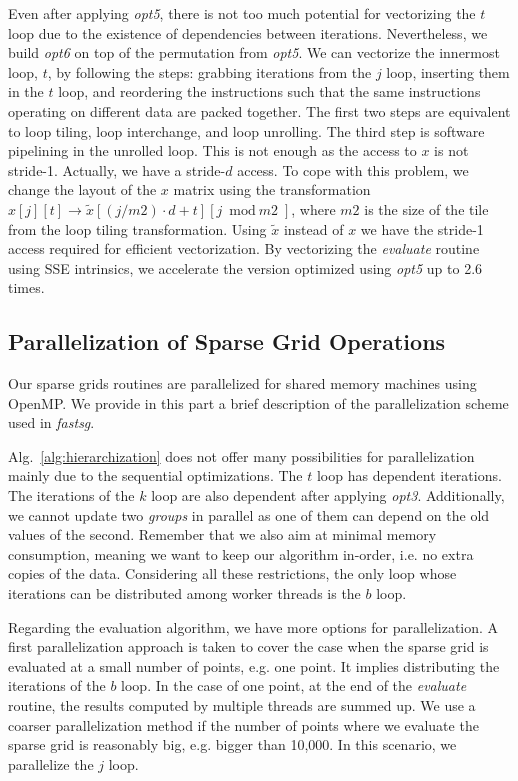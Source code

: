 Even after applying \textit{opt5}, there is not too much potential for vectorizing the $t$ loop due to the existence of dependencies between iterations. Nevertheless, we build \textit{opt6} on top of the permutation from \textit{opt5}. We can vectorize the innermost loop, $t$, by following the steps: grabbing iterations from the $j$ loop, inserting them in the $t$ loop, and reordering the instructions such that the same instructions operating on different data are packed together. The first two steps are equivalent to loop tiling, loop interchange, and loop unrolling. The third step is software pipelining in the unrolled loop. This is not enough as the access to $x$ is not stride-1. Actually, we have a stride-$d$ access. To cope with this problem, we change the layout of the $x$ matrix using the transformation $x[j][t] \rightarrow \tilde{x}[(j/\textit{m2}) \cdot d + t][j \bmod \textit{m2}]$, where $\textit{m2}$ is the size of the tile from the loop tiling transformation. Using $\tilde{x}$ instead of $x$ we have the stride-1 access required for efficient vectorization. By vectorizing the \textit{evaluate} routine using SSE intrinsics, we accelerate the version optimized using \textit{opt5} up to 2.6 times. 

\subsection{Parallelization of Sparse Grid Operations}

Our sparse grids routines are parallelized for shared memory machines using OpenMP. We provide in this part a brief description of the parallelization scheme used in \textit{fastsg}. 

Alg.~\ref{alg:hierarchization} does not offer many possibilities for parallelization mainly due to the sequential optimizations. The $t$ loop has dependent iterations. The iterations of the $k$ loop are also dependent after applying \textit{opt3}. Additionally, we cannot update two \textit{groups} in parallel as one of them can depend on the old values of the second. Remember that we also aim at minimal memory consumption, meaning we want to keep our algorithm in-order, i.e. no extra copies of the data. Considering all these restrictions, the only loop whose iterations can be distributed among worker threads is the $b$ loop. 

Regarding the evaluation algorithm, we have more options for parallelization. A first parallelization approach is taken to cover the case when the sparse grid is evaluated at a small number of points, e.g. one point. It implies distributing the iterations of the $b$ loop. In the case of one point, at the end of the \textit{evaluate} routine, the results computed by multiple threads are summed up. We use a coarser parallelization method if the number of points where we evaluate the sparse grid is reasonably big, e.g. bigger than 10,000. In this scenario, we parallelize the $j$ loop.